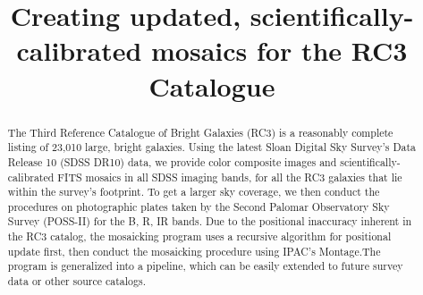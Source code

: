 \documentclass[5p]{elsarticle}
\begin{document}
\begin{frontmatter}
\title{Creating updated, scientifically-calibrated mosaics for the RC3 Catalogue}
	\begin{abstract}
The Third Reference Catalogue of Bright Galaxies (RC3) is a reasonably complete listing of 23,010 large, bright galaxies. Using the latest Sloan Digital Sky Survey's  Data Release 10 (SDSS DR10) data, we provide  color composite images and scientifically-calibrated FITS mosaics in all SDSS imaging bands, for all the RC3 galaxies that lie within the survey's footprint. To get a larger sky coverage, we then conduct the procedures on  photographic plates taken by the Second Palomar Observatory Sky Survey (POSS-II) for  the B, R, IR bands. Due to the positional inaccuracy inherent in the RC3 catalog, the mosaicking program uses a recursive algorithm for positional update first, then conduct the mosaicking procedure using IPAC's Montage.The program is generalized into a pipeline, which can be easily extended to future survey data or other source catalogs.
	\end{abstract}
\end{frontmatter}
\end{document}
